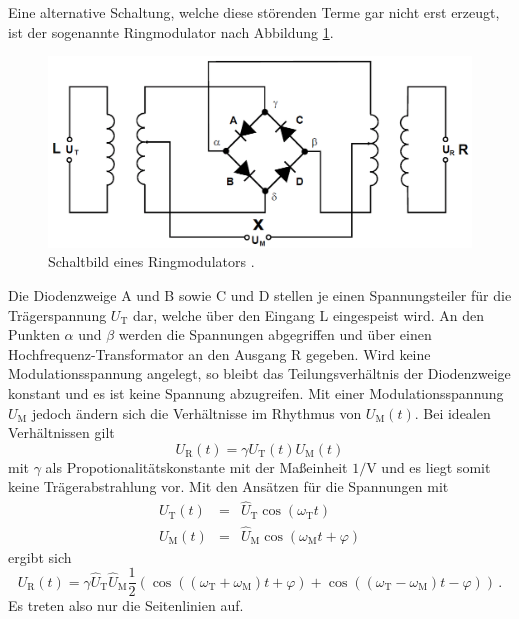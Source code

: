 Eine alternative Schaltung, welche diese störenden Terme gar nicht erst erzeugt, ist der sogenannte Ringmodulator nach Abbildung \ref{am:ringmodulator}.

\begin{figure}[!h]
    \centering
    \includegraphics[width = 14cm]{images/ringmodulator.png}
    \caption{Schaltbild eines Ringmodulators \cite{V59}.}
    \label{am:ringmodulator}
\end{figure}

Die Diodenzweige A und B sowie C und D stellen je einen Spannungsteiler für die Trägerspannung $U_\text{T}$ dar, welche über den Eingang L eingespeist wird.
An den Punkten $\alpha$ und $\beta$ werden die Spannungen abgegriffen und über einen Hochfrequenz-Transformator an den Ausgang R gegeben.
Wird keine Modulationsspannung angelegt, so bleibt das Teilungsverhältnis der Diodenzweige konstant und es ist keine Spannung abzugreifen.
Mit einer Modulationsspannung $U_\text{M}$ jedoch ändern sich die Verhältnisse im Rhythmus von $U_\text{M}(t)$.
Bei idealen Verhältnissen gilt
\begin{equation*}
    U_\text{R}(t) = \gamma U_\text{T}(t) U_\text{M}(t)
\end{equation*}
mit $\gamma$ als Propotionalitätskonstante mit der Maßeinheit $\si{1\per\volt}$ und es liegt somit keine Trägerabstrahlung vor.
Mit den Ansätzen für die Spannungen mit 
\begin{eqnarray*}
    U_\text{T}(t) &=& \hat{U}_\text{T} \cos{\left(\omega_\text{T} t\right)} \\
    U_\text{M}(t) &=& \hat{U}_\text{M} \cos{\left(\omega_\text{M} t + \varphi \right)}
\end{eqnarray*}
ergibt sich
\begin{equation*}
    U_\text{R}(t) = \gamma \hat{U}_\text{T} \hat{U}_\text{M} \frac{1}{2} \left( \cos{\left( \left( \omega_\text{T} + \omega_\text{M} \right) t + \varphi \right)} + \cos{\left( \left( \omega_\text{T} - \omega_\text{M} \right) t - \varphi \right)} \right) \,.
\end{equation*}
Es treten also nur die Seitenlinien auf.

